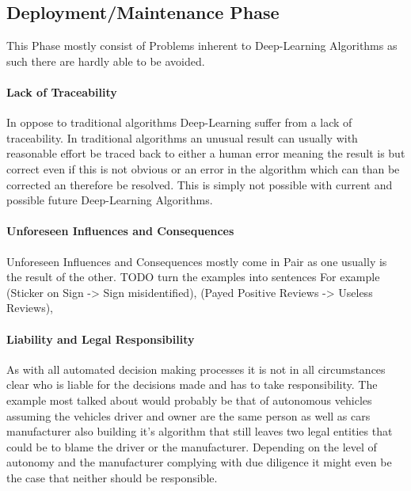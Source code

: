 \subsection{Deployment/Maintenance Phase}
This Phase mostly consist of Problems inherent to
Deep-Learning Algorithms as such there are hardly 
able to be avoided.

\paragraph{Lack of Traceability}
In oppose to traditional algorithms Deep-Learning
suffer from a lack of traceability.
In traditional algorithms an unusual result can 
usually with reasonable effort be traced back to either 
a human error meaning the result is but correct even if this is not obvious or an error in the algorithm which can than be corrected an therefore be resolved. This is simply not possible with current and possible future Deep-Learning Algorithms.

\paragraph{Unforeseen Influences and Consequences}
Unforeseen Influences and Consequences mostly come in Pair
as one usually is the result of the other.
{\color{red} TODO turn the examples into sentences}
For example (Sticker on Sign -> Sign misidentified),
(Payed Positive Reviews -> Useless Reviews),

\paragraph{Liability and Legal Responsibility}
As with all automated decision making processes 
it is not in all circumstances clear who is liable for 
the decisions made and has to take responsibility.
The example most talked about would probably be 
that of autonomous vehicles assuming the vehicles driver and owner are the same person as well as cars manufacturer also building it's algorithm that still leaves two legal entities that could  be to blame the driver or the manufacturer.
Depending on the level of autonomy and the manufacturer complying with due diligence it might even be the case that neither should be responsible.